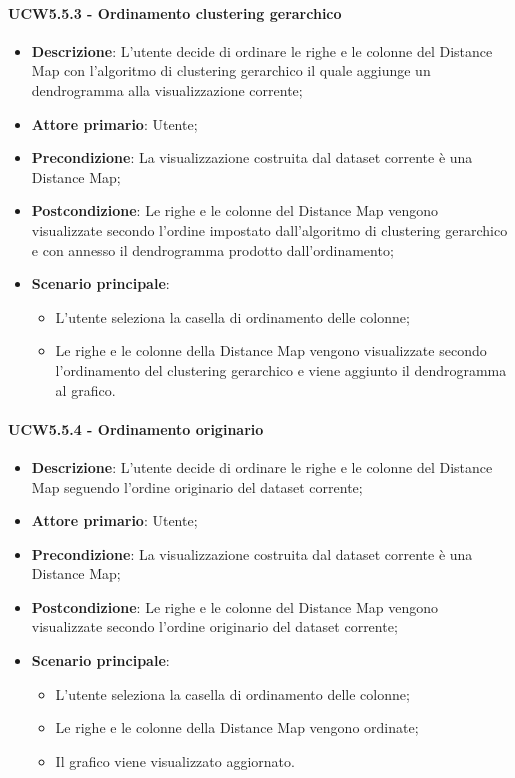 \paragraph{UCW5.5.3 - Ordinamento clustering gerarchico}
\label{par:ucw5.5.3}
\begin{itemize}
    \item \textbf{Descrizione}: L'utente decide di ordinare le righe e le colonne del Distance Map con l'algoritmo di clustering gerarchico il quale aggiunge un dendrogramma alla visualizzazione corrente;
    \item \textbf{Attore primario}: Utente;
    \item \textbf{Precondizione}: La visualizzazione costruita dal dataset corrente è una Distance Map;
    \item \textbf{Postcondizione}: Le righe e le colonne del Distance Map vengono visualizzate secondo l'ordine impostato dall'algoritmo di clustering gerarchico e con annesso il dendrogramma prodotto dall'ordinamento;
    \item \textbf{Scenario principale}:
    \begin{itemize}
        \item L'utente seleziona la casella di ordinamento delle colonne;
        \item Le righe e le colonne della Distance Map vengono visualizzate secondo l'ordinamento del clustering gerarchico e viene aggiunto il dendrogramma al grafico.
    \end{itemize}
\end{itemize}

\paragraph{UCW5.5.4 - Ordinamento originario}
\label{par:ucw5.5.4}
\begin{itemize}
    \item \textbf{Descrizione}: L'utente decide di ordinare le righe e le colonne del Distance Map seguendo l'ordine originario del dataset corrente;
    \item \textbf{Attore primario}: Utente;
    \item \textbf{Precondizione}: La visualizzazione costruita dal dataset corrente è una Distance Map;
    \item \textbf{Postcondizione}: Le righe e le colonne del Distance Map vengono visualizzate secondo l'ordine originario del dataset corrente;
    \item \textbf{Scenario principale}:
    \begin{itemize}
        \item L'utente seleziona la casella di ordinamento delle colonne;
        \item Le righe e le colonne della Distance Map vengono ordinate;
        \item Il grafico viene visualizzato aggiornato.
    \end{itemize}
\end{itemize}


